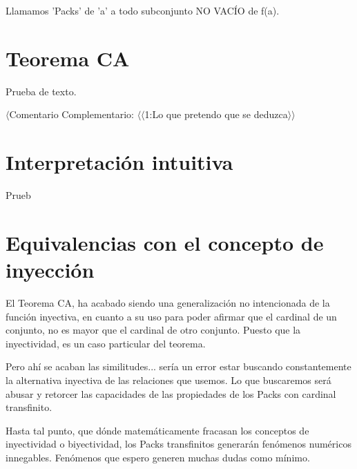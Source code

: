 Llamamos 'Packs' de 'a' a todo subconjunto NO VACÍO de f(a).



\newpage
\section{Teorema CA}
Prueba de texto.


$\langle$Comentario Complementario: $\langle\langle$1:Lo que pretendo que se deduzca$\rangle\rangle$

\newpage
\section{Interpretación intuitiva}
Prueb

\newpage
\section{Equivalencias con el concepto de inyección}

El Teorema CA, ha acabado siendo una generalización no intencionada de la función inyectiva, en cuanto a su uso para poder afirmar que el cardinal de un conjunto, no es mayor que el cardinal de otro conjunto. Puesto que la inyectividad, es un caso particular del teorema.

Pero ahí se acaban las similitudes... sería un error estar buscando constantemente la alternativa inyectiva de las relaciones que usemos. Lo que buscaremos será abusar y retorcer las capacidades de las propiedades de los Packs con cardinal transfinito.

Hasta tal punto, que dónde matemáticamente fracasan los conceptos de inyectividad o biyectividad, los Packs transfinitos generarán fenómenos numéricos innegables. Fenómenos que espero generen muchas dudas como mínimo.